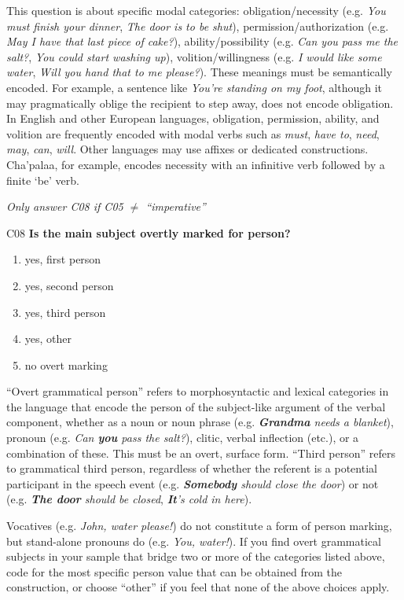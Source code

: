 \documentclass[output=paper]{langsci/langscibook}
\begin{document}
\begin{description}
{This question is about specific modal categories: obligation/necessity (e.g. \textit{You must finish your dinner}, \textit{The door is to be shut}), permission/authorization (e.g. \textit{May I have that last piece of cake?}), ability/possibility (e.g. \textit{Can you pass me the salt?}, \textit{You could start washing up}), volition/willingness (e.g. \textit{I would like some water}, \textit{Will you hand that to me please?}). These meanings must be semantically encoded. For example, a sentence like \textit{You’re standing on my foot}, although it may pragmatically oblige the recipient to step away, does not encode obligation. In English and other European languages, obligation, permission, ability, and volition are frequently encoded with modal verbs such as \textit{must}, \textit{have to}, \textit{need}, \textit{may}, \textit{can}, \textit{will}. Other languages may use affixes or dedicated constructions. Cha'palaa, for example, encodes necessity with an infinitive verb followed by a finite ‘be’ verb.}

\smallskip

\item
{\textit{Only answer C08 if C05 ${\neq}$ “imperative”}}

\item
{C08  \textbf{Is the main subject overtly marked for person?}}
\begin{enumerate}
\item {yes, first person}
\item {yes, second person}
\item {yes, third person}
\item {yes, other}
\item {no overt marking}
\end{enumerate}

“Overt grammatical person” refers to morphosyntactic and lexical categories in the language that encode the person of the subject-like argument of the verbal component, whether as a noun or noun phrase (e.g. \textit{\textbf{Grandma} needs a blanket}), pronoun (e.g. \textit{Can \textbf{you} pass the salt?}), clitic, verbal inflection (etc.), or a combination of these. This must be an overt, surface form. “Third person” refers to grammatical third person, regardless of whether the referent is a potential participant in the speech event (e.g. \textit{\textbf{Somebody} should close the door}) or not (e.g. \textit{\textbf{The door} should be closed}, \textit{\textbf{It}’s cold in here}).

Vocatives (e.g. \textit{John, water please!}) do not constitute a form of person marking, but stand-alone pronouns do (e.g. \textit{You, water!}). If you find overt grammatical subjects in your sample that bridge two or more of the categories listed above, code for the most specific person value that can be obtained from the construction, or choose “other” if you feel that none of the above choices apply.


\end{description}
\end{document}
